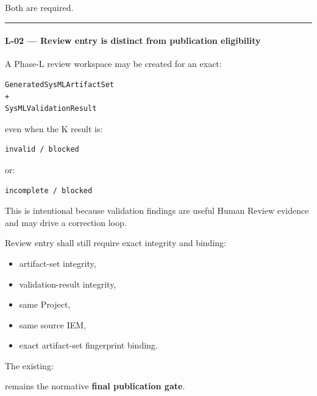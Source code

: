Both are required.

\begin{center}\rule{0.5\linewidth}{0.5pt}\end{center}

\hypertarget{l-02--review-entry-is-distinct-from-publication-eligibility}{%
\paragraph{L-02 --- Review entry is distinct from publication eligibility}\label{l-02--review-entry-is-distinct-from-publication-eligibility}}

A Phase-L review workspace may be created for an exact:

\begin{verbatim}
GeneratedSysMLArtifactSet
+
SysMLValidationResult
\end{verbatim}

even when the K result is:

\begin{verbatim}
invalid / blocked
\end{verbatim}

or:

\begin{verbatim}
incomplete / blocked
\end{verbatim}

This is intentional because validation findings are useful Human Review evidence and may drive a correction loop.

Review entry shall still require exact integrity and binding:

\begin{itemize}
\tightlist
\item
  artifact-set integrity,
\item
  validation-result integrity,
\item
  same Project,
\item
  same source IEM,
\item
  exact artifact-set fingerprint binding.
\end{itemize}

The existing:

\begin{Shaded}
\begin{Highlighting}[]
\end{Highlighting}
\end{Shaded}

remains the normative \textbf{final publication gate}.

